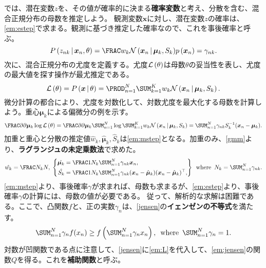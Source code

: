 \documentclass[10pt,a4paper]{book}
\begin{document}
では、潜在変数$z$を、その値が確率的に決まる\textbf{確率変数}と考え、分散を含む、混合正規分布の母数を推定しよう。
観測変数$\bm{x}$に対し、潜在変数$z$の確率は、\eqref{em:estep}で求まる。観測に基づき推定した確率なので、これを事後確率と呼ぶ。
%
\begin{equation}
\label{eq:em:estep}
\Prob{z_{nk}}[\bm{x}_n,\theta] = \frac{w_k \Nd{\bm{x}_n}{\bm{\mu}_k,S_k}}{\prob{\bm{x}_n}} = \gamma_{nk}.
\end{equation}
%
次に、混合正規分布の尤度を定義する。尤度$\mathcal{L}\left(\theta\right)$は母数$\theta$の妥当性を表し、尤度の最大値を探す操作が最尤推定である。
%
\begin{equation}
\label{eq:em:L}
\Lk{\theta} =
\Prob{\bm{x}}[\theta] =
\prod_{n=1}^N \sum_{k=1}^K w_k \Nd{\bm{x}_n}{\bm{\mu}_k,S_k}.
\end{equation}
%
微分計算の都合により、尤度を対数化して、対数尤度を最大化する母数を計算しよう。重心$\bm{\mu}_k$による偏微分の例を示す。
%
\begin{equation}
\label{eq:em:L:m}
\pdiff{}{\bm{\mu}_k}\log\Lk{\theta} =
\pdiff{}{\bm{\mu}_k}\sum_{n=1}^N \log\sum_{k=1}^K w_k \Nd{\bm{x}_n}{\bm{\mu}_k,S_k} =
\sum_{n=1}^N \gamma_{nk} S_k^{-1} (\bm{x}_n - \bm{\mu}_k).
\end{equation}
%
加重と重心と分散の推定値$\hat{w}_k,\hat{\bm{\mu}}_k,\hat{S}_k$は\eqref{em:mstep}となる。加重のみ、\eqref{gmm}より、\textbf{ラグランジュの未定乗数法}で求めた。
%
\begin{equation}
\label{eq:em:mstep}
\hat{w_k} = \frac{N_k}{N},\esp
\left\{
\begin{aligned}
\hat{\bm{\mu}_k} &= \frac{1}{N_k} \sum_{n=1}^N \gamma_{nk} \bm{x}_n,\\
\hat{S_k} &= \frac{1}{N_k} \sum_{n=1}^N \gamma_{nk} (\bm{x}_n - \hat{\bm{\mu}}_k) \trans{(\bm{x}_n - \hat{\bm{\mu}}_k)},
\end{aligned}
\right\}
\where
N_k = \sum_{n=1}^N \gamma_{nk}.
\end{equation}
%
\eqref{em:mstep}より、事後確率$\gamma$が求まれば、母数も求まるが、\eqref{em:estep}より、事後確率$\gamma$の計算には、母数の値が必要である。
従って、解析的な求解は困難である。ここで、凸関数$f$と、正の実数$\gamma_n$は、\eqref{jensen}の\textbf{イェンゼンの不等式}を満たす。
%
\begin{equation}
\label{eq:jensen}
\sum_{n=1}^N \gamma_n f(x_n) \geq f\tup{\sum_{n=1}^N \gamma_n x_n},
\where
\sum_{n=1}^N \gamma_n=1.
\end{equation}
%
対数が凹関数である点に注意して、\eqref{jensen}に\eqref{em:L}を代入して、\eqref{em:jensen}の関数$Q$を得る。これを\textbf{補助関数}と呼ぶ。
\end{document}
